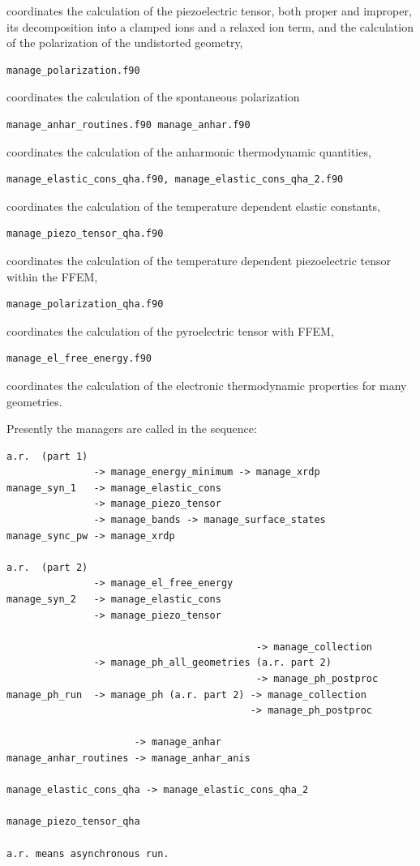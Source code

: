\documentclass[12pt,a4paper,twoside]{report}
\begin{document}
coordinates the calculation of the piezoelectric tensor, both proper and
improper, its decomposition into a clamped ions and a relaxed ion term, and
the calculation of the polarization of the undistorted geometry,
\begin{verbatim}
manage_polarization.f90  
\end{verbatim}
coordinates the calculation of the spontaneous polarization
\begin{verbatim}
manage_anhar_routines.f90 manage_anhar.f90               
\end{verbatim}
coordinates the calculation of the anharmonic thermodynamic quantities,
\begin{verbatim}
manage_elastic_cons_qha.f90, manage_elastic_cons_qha_2.f90        
\end{verbatim}
coordinates the calculation of the temperature dependent elastic constants,
\begin{verbatim}
manage_piezo_tensor_qha.f90
\end{verbatim}
coordinates the calculation of the temperature dependent piezoelectric tensor
within the FFEM,
\begin{verbatim}
manage_polarization_qha.f90  
\end{verbatim}
coordinates the calculation of the pyroelectric tensor with FFEM,
\begin{verbatim}
manage_el_free_energy.f90      
\end{verbatim}
coordinates the calculation of the electronic thermodynamic properties for
many geometries.

Presently the managers are called in the sequence:
\begin{verbatim}
a.r.  (part 1)
               -> manage_energy_minimum -> manage_xrdp
manage_syn_1   -> manage_elastic_cons
               -> manage_piezo_tensor
               -> manage_bands -> manage_surface_states
manage_sync_pw -> manage_xrdp

a.r.  (part 2)
               -> manage_el_free_energy
manage_syn_2   -> manage_elastic_cons
               -> manage_piezo_tensor

                                           -> manage_collection
               -> manage_ph_all_geometries (a.r. part 2) 
                                           -> manage_ph_postproc
manage_ph_run  -> manage_ph (a.r. part 2) -> manage_collection
                                          -> manage_ph_postproc

                      -> manage_anhar
manage_anhar_routines -> manage_anhar_anis

manage_elastic_cons_qha -> manage_elastic_cons_qha_2

manage_piezo_tensor_qha

a.r. means asynchronous run.
\end{verbatim}
\end{document}
